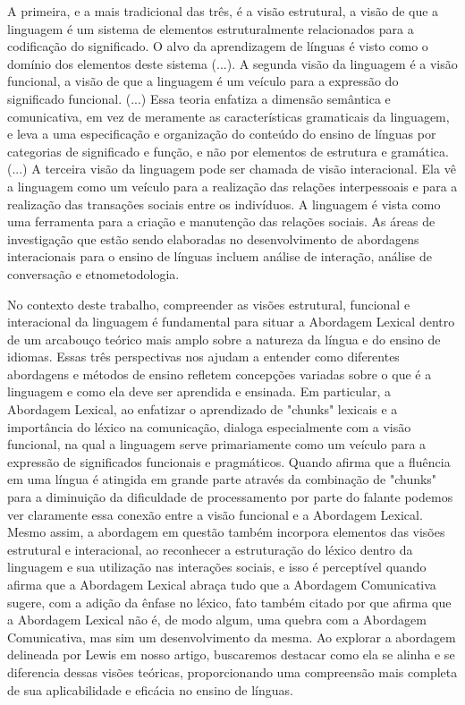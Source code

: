 \begin{citar}
A primeira, e a mais tradicional das três, é a visão estrutural, a visão de que a linguagem é um sistema de elementos estruturalmente relacionados para a codificação do significado. O alvo da aprendizagem de línguas é visto como o domínio dos elementos deste sistema (...). A segunda visão da linguagem é a visão funcional, a visão de que a linguagem é um veículo para a expressão do significado funcional. (...) Essa teoria enfatiza a dimensão semântica e comunicativa, em vez de meramente as características gramaticais da linguagem, e leva a uma especificação e organização do conteúdo do ensino de línguas por categorias de significado e função, e não por elementos de estrutura e gramática. (...) A terceira visão da linguagem pode ser chamada de visão interacional. Ela vê a linguagem como um veículo para a realização das relações interpessoais e para a realização das transações sociais entre os indivíduos. A linguagem é vista como uma ferramenta para a criação e manutenção das relações sociais. As áreas de investigação que estão sendo elaboradas no desenvolvimento de abordagens interacionais para o ensino de línguas incluem análise de interação, análise de conversação e etnometodologia. \cite{richards2001}
\end{citar}

No contexto deste trabalho, compreender as visões estrutural, funcional e interacional da linguagem é fundamental para situar a Abordagem Lexical dentro de um arcabouço teórico mais amplo sobre a natureza da língua e do ensino de idiomas. Essas três perspectivas nos ajudam a entender como diferentes abordagens e métodos de ensino refletem concepções variadas sobre o que é a linguagem e como ela deve ser aprendida e ensinada. Em particular, a Abordagem Lexical, ao enfatizar o aprendizado de "chunks" lexicais e a importância do léxico na comunicação, dialoga especialmente com a visão funcional, na qual a linguagem serve primariamente como um veículo para a expressão de significados funcionais e pragmáticos. Quando  afirma que a fluência em uma língua é atingida em grande parte através da combinação de "chunks" para a diminuição da dificuldade de processamento por parte do falante podemos ver claramente essa conexão entre a visão funcional e a Abordagem Lexical. Mesmo assim, a abordagem em questão também incorpora elementos das visões estrutural e interacional, ao reconhecer a estruturação do léxico dentro da linguagem e sua utilização nas interações sociais, e isso é perceptível quando  afirma que a Abordagem Lexical abraça tudo que a Abordagem Comunicativa sugere, com a adição da ênfase no léxico, fato também citado por  que afirma que a Abordagem Lexical não é, de modo algum, uma quebra com a Abordagem Comunicativa, mas sim um desenvolvimento da mesma. Ao explorar a abordagem delineada por Lewis em nosso artigo, buscaremos destacar como ela se alinha e se diferencia dessas visões teóricas, proporcionando uma compreensão mais completa de sua aplicabilidade e eficácia no ensino de línguas.

